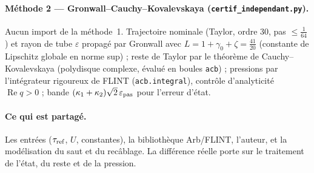 \documentclass[11pt,a4paper]{article}
\theoremstyle{remark}
\begin{document}
\paragraph{Méthode 2 --- Gronwall--Cauchy--Kovalevskaya (\texttt{certif\_independant.py}).} Aucun import de la méthode~1. Trajectoire nominale (Taylor, ordre 30, pas $\le\tfrac1{64}$) et rayon de tube $\varepsilon$ propagé par Gronwall avec $L=1+\gamma_0+\zeta=\tfrac{41}{20}$ (constante de Lipschitz globale en norme sup) ; reste de Taylor par le théorème de Cauchy--Kovalevskaya (polydisque complexe, évalué en boules \texttt{acb}) ; pressions par l'intégrateur rigoureux de FLINT (\texttt{acb.integral}), contrôle d'analyticité $\operatorname{Re}q>0$ ; bande $(\kappa_1+\kappa_2)\sqrt2\,\varepsilon_{\rm pas}$ pour l'erreur d'état.

\paragraph{Ce qui est partagé.} Les entrées ($\tau_{\rm ref}$, $U$, constantes), la bibliothèque Arb/FLINT, l'auteur, et la modélisation du saut et du recâblage. La différence réelle porte sur le traitement de l'état, du reste et de la pression.
\end{document}
